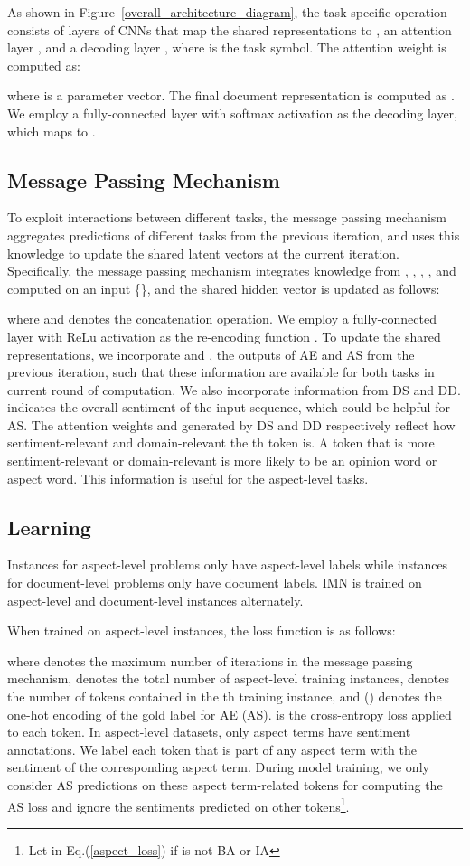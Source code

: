 \documentclass[11pt,a4paper]{article}
\begin{document}
As shown in Figure~\ref{overall_architecture_diagram}, the task-specific operation  consists of  layers of CNNs that map the shared representations  to , an attention layer , and a decoding layer , where  is the task symbol. The attention weight is computed as:

where  is a parameter vector. The final document representation is computed as
. We employ a fully-connected layer with softmax activation as the decoding layer, which maps  to .

\subsection{Message Passing Mechanism}
To exploit interactions between different tasks, the message passing mechanism aggregates predictions of different tasks from the previous iteration, and uses this knowledge to update the shared latent vectors  at the current iteration. 
Specifically, the message passing mechanism integrates knowledge from , , , , and  computed on an input \{\}, and the shared hidden vector  is updated as follows:

where  and  denotes the concatenation operation.
We employ a fully-connected layer with ReLu activation as the re-encoding function . 
To update the shared representations, we incorporate  and , the outputs of AE and AS from the previous iteration, such that these information are available for both tasks in current round of computation.
We also incorporate information from DS and DD.  indicates the overall sentiment of the input sequence, which could be helpful for AS. The attention weights  and  generated by DS and DD respectively reflect how sentiment-relevant and domain-relevant the th token is. A token that is more sentiment-relevant or domain-relevant is more likely to be an opinion word or aspect word. This information is useful for the aspect-level tasks. 



\subsection{Learning}
Instances for aspect-level problems only have aspect-level labels while instances for document-level problems only have document labels.  IMN is trained on aspect-level and document-level instances alternately. 

When trained on aspect-level instances, the loss function is as follows:

where  denotes the maximum number of iterations in the message passing mechanism,  denotes the total number of aspect-level training instances,  denotes the number of tokens contained in the th training instance, and  () denotes the one-hot encoding of the gold label for AE (AS).  is the cross-entropy loss applied to each token. In aspect-level datasets, only aspect terms have sentiment annotations. We label each token that is part of any aspect term with the sentiment of the corresponding aspect term. During model training, we only consider AS predictions on these aspect term-related tokens for computing the AS loss and ignore the sentiments predicted on other tokens\footnote{Let  in Eq.(\ref{aspect_loss}) if  is not BA or IA}. 
\end{document}
